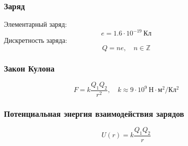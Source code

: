 \documentclass[12pt, a4paper]{article}
\begin{document}
\subsubsection*{Заряд}

Элементарный заряд:
\[
e = 1.6\cdot10^{-19}\ \mathrm{Кл}
\]
Дискретность заряда:
\[
Q = ne,
\quad n \in \mathbb{Z}
\]

\subsubsection*{Закон Кулона}

\[
F = k \frac{Q_{1} Q_{2}}{r^{2}},
\quad k \approx 9\cdot10^{9}\ \mathrm{Н\cdot м^{2}/Кл^{2}}
\]

\subsubsection*{Потенциальная энергия взаимодействия зарядов}

\[
U(r) = k \frac{Q_1 Q_2}{r}
\]
\end{document}
